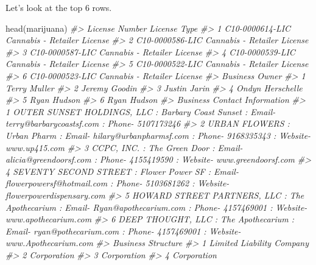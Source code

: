 \documentclass[
  12pt,
  openany]{book}
\newenvironment{Shaded}{\begin{snugshade}}{\end{snugshade}}
\newcommand{\CommentTok}[1]{\textcolor[rgb]{0.37,0.37,0.37}{\textit{#1}}}
\newcommand{\FunctionTok}[1]{\textcolor[rgb]{0,0,0}{#1}}
\newcommand{\NormalTok}[1]{#1}
\begin{document}
Let's look at the top 6 rows.

\begin{Shaded}
\begin{Highlighting}[]
\FunctionTok{head}\NormalTok{(marijuana)}
\CommentTok{\#\textgreater{}    License Number                License Type}
\CommentTok{\#\textgreater{} 1 C10{-}0000614{-}LIC Cannabis {-} Retailer License}
\CommentTok{\#\textgreater{} 2 C10{-}0000586{-}LIC Cannabis {-} Retailer License}
\CommentTok{\#\textgreater{} 3 C10{-}0000587{-}LIC Cannabis {-} Retailer License}
\CommentTok{\#\textgreater{} 4 C10{-}0000539{-}LIC Cannabis {-} Retailer License}
\CommentTok{\#\textgreater{} 5 C10{-}0000522{-}LIC Cannabis {-} Retailer License}
\CommentTok{\#\textgreater{} 6 C10{-}0000523{-}LIC Cannabis {-} Retailer License}
\CommentTok{\#\textgreater{}     Business Owner}
\CommentTok{\#\textgreater{} 1     Terry Muller}
\CommentTok{\#\textgreater{} 2    Jeremy Goodin}
\CommentTok{\#\textgreater{} 3     Justin Jarin}
\CommentTok{\#\textgreater{} 4 Ondyn Herschelle}
\CommentTok{\#\textgreater{} 5      Ryan Hudson}
\CommentTok{\#\textgreater{} 6      Ryan Hudson}
\CommentTok{\#\textgreater{}                                                                                                           Business Contact Information}
\CommentTok{\#\textgreater{} 1                             OUTER SUNSET HOLDINGS, LLC  : Barbary Coast Sunset : Email{-} terry@barbarycoastsf.com : Phone{-} 5107173246}
\CommentTok{\#\textgreater{} 2                           URBAN FLOWERS  : Urban Pharm : Email{-} hilary@urbanpharmsf.com : Phone{-} 9168335343 : Website{-} www.up415.com}
\CommentTok{\#\textgreater{} 3                      CCPC, INC.  : The Green Door : Email{-} alicia@greendoorsf.com : Phone{-} 4155419590 : Website{-} www.greendoorsf.com}
\CommentTok{\#\textgreater{} 4 SEVENTY SECOND STREET  : Flower Power SF : Email{-} flowerpowersf@hotmail.com : Phone{-} 5103681262 : Website{-} flowerpowerdispensary.com}
\CommentTok{\#\textgreater{} 5   HOWARD STREET PARTNERS, LLC  : The Apothecarium : Email{-} Ryan@apothecarium.com : Phone{-} 4157469001 : Website{-} www.apothecarium.com}
\CommentTok{\#\textgreater{} 6              DEEP THOUGHT, LLC  : The Apothecarium : Email{-} ryan@pothecarium.com : Phone{-} 4157469001 : Website{-} www.Apothecarium.com}
\CommentTok{\#\textgreater{}          Business Structure}
\CommentTok{\#\textgreater{} 1 Limited Liability Company}
\CommentTok{\#\textgreater{} 2               Corporation}
\CommentTok{\#\textgreater{} 3               Corporation}
\CommentTok{\#\textgreater{} 4               Corporation}

\end{Highlighting}
\end{Shaded}
\end{document}
